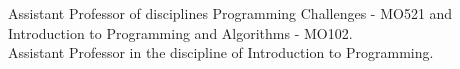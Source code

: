 \documentclass[10pt,a4paper,ragged2e,withhyper]{altacv}
\begin{document}
\begin{paracol}{2}

        \medskip
        {Assistant Professor of disciplines Programming Challenges - MO521 and
          Introduction to Programming and Algorithms - MO102. \\}
        \divider
        \medskip
        {Assistant Professor in the discipline of Introduction to Programming. \\}
        \divider
    \end{paracol}
    
\end{document}
